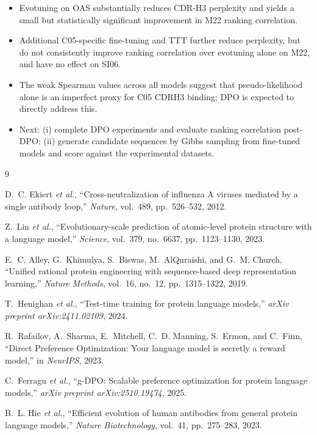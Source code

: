 \documentclass[11pt, a4paper]{article}
\begin{document}
\begin{itemize}[nosep]
    \item Evotuning on OAS substantially reduces CDR-H3 perplexity and yields a small but statistically significant improvement in M22 ranking correlation.
    \item Additional C05-specific fine-tuning and TTT further reduce perplexity, but do not consistently improve ranking correlation over evotuning alone on M22, and have no effect on SI06.
    \item The weak Spearman values across all models suggest that pseudo-likelihood alone is an imperfect proxy for C05 CDRH3 binding; DPO is expected to directly address this.
    \item Next: (i) complete DPO experiments and evaluate ranking correlation post-DPO; (ii) generate candidate sequences by Gibbs sampling from fine-tuned models and score against the experimental datasets.
\end{itemize}


\begin{thebibliography}{9}
\small

D.~C. Ekiert \emph{et al.},
``Cross-neutralization of influenza A viruses mediated by a single antibody loop,''
\emph{Nature}, vol.~489, pp.~526--532, 2012.

Z.~Lin \emph{et al.},
``Evolutionary-scale prediction of atomic-level protein structure with a language model,''
\emph{Science}, vol.~379, no.~6637, pp.~1123--1130, 2023.

E.~C. Alley, G.~Khimulya, S.~Biswas, M.~AlQuraishi, and G.~M. Church,
``Unified rational protein engineering with sequence-based deep representation learning,''
\emph{Nature Methods}, vol.~16, no.~12, pp.~1315--1322, 2019.

T.~Henighan \emph{et al.},
``Test-time training for protein language models,''
\emph{arXiv preprint arXiv:2411.02109}, 2024.

R.~Rafailov, A.~Sharma, E.~Mitchell, C.~D. Manning, S.~Ermon, and C.~Finn,
``Direct Preference Optimization: Your language model is secretly a reward model,''
in \emph{NeurIPS}, 2023.

C.~Ferragu \emph{et al.},
``g-DPO: Scalable preference optimization for protein language models,''
\emph{arXiv preprint arXiv:2510.19474}, 2025.

B.~L. Hie \emph{et al.},
``Efficient evolution of human antibodies from general protein language models,''
\emph{Nature Biotechnology}, vol.~41, pp.~275--283, 2023.

\end{thebibliography}
\end{document}
